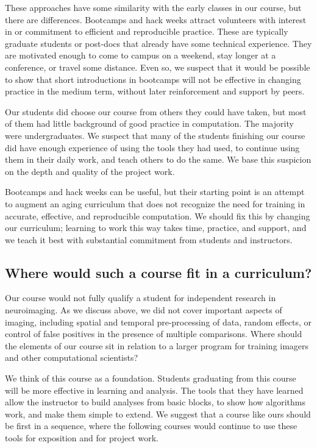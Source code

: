 These approaches have some similarity with the early classes in our course,
but there are differences.  Bootcamps and hack weeks attract volunteers with
interest in or commitment to efficient and reproducible practice. These are
typically graduate students or post-docs that already have some technical
experience.  They are motivated enough to come to campus on a weekend,
stay longer at a conference, or travel some distance.  Even so, we suspect
that it would be possible to show that short introductions in
bootcamps will not be effective in changing practice in the medium term,
without later reinforcement and support by peers.

Our students did choose our course from others they could have taken, but most
of them had little background of good practice in computation.  The majority
were undergraduates.  We suspect that many of the students finishing our
course did have enough experience of using the tools they had used, to
continue using them in their daily work, and teach others to do the same.  We
base this suspicion on the depth and quality of the project work.

Bootcamps and hack weeks can be useful, but their starting point is an
attempt to augment an aging curriculum that does not recognize the need for
training in accurate, effective, and reproducible computation.  We should fix
this by changing our curriculum; learning to work this way takes time,
practice, and support, and we teach it best with substantial commitment from
students and instructors.

\subsection{Where would such a course fit in a curriculum?}

Our course would not fully qualify a student for independent research in
neuroimaging.  As we discuss above, we did not cover important aspects of
imaging, including spatial and temporal pre-processing of data, random effects,
or control of false positives in the presence of multiple comparisons.  Where
should the elements of our course sit in relation to a larger program for
training imagers and other computational scientists?

We think of this course as a foundation.  Students graduating from this course
will be more effective in learning and analysis.  The tools that they have
learned allow the instructor to build analyses from basic blocks, to
show how algorithms work, and make them simple to extend.  We
suggest that a course like ours should be first in a sequence, where the
following courses would continue to use these tools for exposition and for
project work.


